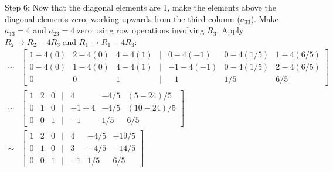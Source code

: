 \documentclass{article}
\begin{document}
Step 6: Now that the diagonal elements are 1, make the elements above the diagonal elements zero, working upwards from the third column ($a_{33}$). Make $a_{13}=4$ and $a_{23}=4$ zero using row operations involving $R_3$.
Apply $R_2 \to R_2 - 4R_3$ and $R_1 \to R_1 - 4R_3$:
\begin{align*} \sim &\begin{bmatrix} 1 - 4(0) & 2 - 4(0) & 4 - 4(1) & | & 0 - 4(-1) & 0 - 4(1/5) & 1 - 4(6/5) \\ 0 - 4(0) & 1 - 4(0) & 4 - 4(1) & | & -1 - 4(-1) & 0 - 4(1/5) & 2 - 4(6/5) \\ 0 & 0 & 1 & | & -1 & 1/5 & 6/5 \end{bmatrix} \\ \sim &\begin{bmatrix} 1 & 2 & 0 & | & 4 & -4/5 & (5 - 24)/5 \\ 0 & 1 & 0 & | & -1 + 4 & -4/5 & (10 - 24)/5 \\ 0 & 0 & 1 & | & -1 & 1/5 & 6/5 \end{bmatrix} \\ \sim &\begin{bmatrix} 1 & 2 & 0 & | & 4 & -4/5 & -19/5 \\ 0 & 1 & 0 & | & 3 & -4/5 & -14/5 \\ 0 & 0 & 1 & | & -1 & 1/5 & 6/5 \end{bmatrix}\end{align*}
\end{document}
